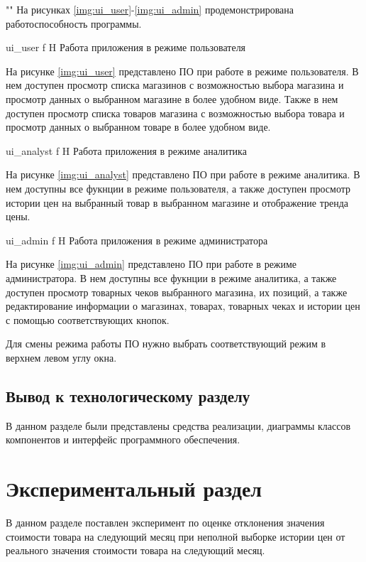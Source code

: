 \documentclass{bmstu}
\begin{document}
""\newline\indent
На рисунках \ref{img:ui_user}-\ref{img:ui_admin} продемонстрирована работоспособность программы.


	{ui_user}
	{f}
	{H}
	{\textwidth}
	{Работа приложения в режиме пользователя}

На рисунке \ref{img:ui_user} представлено ПО при работе в режиме пользователя. В нем доступен просмотр списка магазинов с возможностью выбора магазина и просмотр данных о выбранном магазине в более удобном виде. Также в нем доступен просмотр списка товаров магазина с возможностью выбора товара и просмотр данных о выбранном товаре в более удобном виде.

	{ui_analyst}
	{f}
	{H}
	{\textwidth}
	{Работа приложения в режиме аналитика}
	
На рисунке \ref{img:ui_analyst} представлено ПО при работе в режиме аналитика. В нем доступны все фукнции в режиме пользователя, а также доступен просмотр истории цен на выбранный товар в выбранном магазине и отображение тренда цены.

	{ui_admin}
	{f}
	{H}
	{\textwidth}
	{Работа приложения в режиме администратора}

На рисунке \ref{img:ui_admin} представлено ПО при работе в режиме администратора. В нем доступны все фукнции в режиме аналитика, а также доступен просмотр товарных чеков выбранного магазина, их позиций, а также редактирование информации о магазинах, товарах, товарных чеках и истории цен с помощью соответствующих кнопок.

Для смены режима работы ПО нужно выбрать соответствующий режим в верхнем левом углу окна.

\section*{Вывод к технологическому разделу}

В данном разделе были представлены средства реализации, диаграммы классов компонентов и интерфейс программного обеспечения.

\chapter{Экспериментальный раздел}

В данном разделе поставлен эксперимент по оценке отклонения значения стоимости товара на следующий месяц при неполной выборке истории цен от реального значения стоимости товара на следующий месяц.
\end{document}
